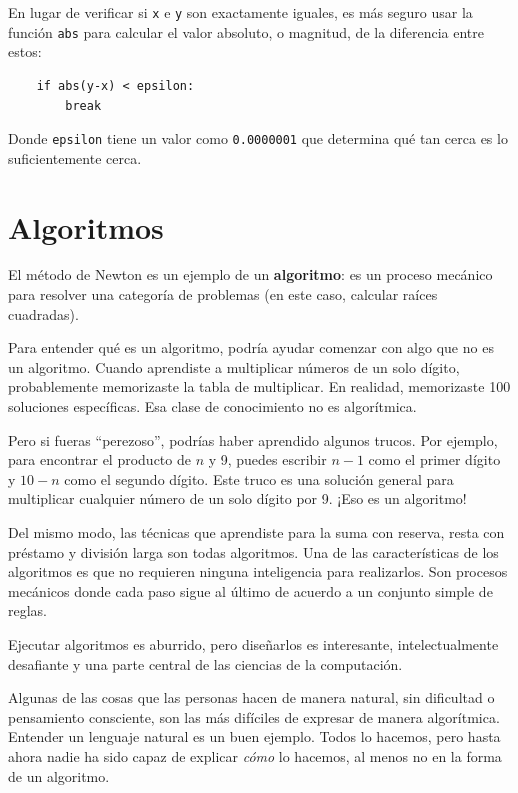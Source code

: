 \documentclass[10pt]{book}
\begin{document}
En lugar de verificar si {\tt x} e {\tt y} son exactamente iguales, es
más seguro usar la función {\tt abs} para calcular el
valor absoluto, o magnitud, de la diferencia entre estos:

\begin{verbatim}
    if abs(y-x) < epsilon:
        break
\end{verbatim}
%
Donde \verb"epsilon" tiene un valor como {\tt 0.0000001} que
determina qué tan cerca es lo suficientemente cerca.


\section{Algoritmos}

El método de Newton es un ejemplo de un {\bf algoritmo}: es un
proceso mecánico para resolver una categoría de problemas (en este
caso, calcular raíces cuadradas).

Para entender qué es un algoritmo, podría ayudar comenzar con
algo que no es un algoritmo.  Cuando aprendiste a multiplicar
números de un solo dígito, probablemente memorizaste la tabla de multiplicar.
En realidad, memorizaste 100 soluciones específicas.  Esa clase de
conocimiento no es algorítmica.

Pero si fueras ``perezoso'', podrías haber aprendido algunos
trucos.  Por ejemplo, para encontrar el producto de $n$ y 9, puedes
escribir $n-1$ como el primer dígito y $10-n$ como el segundo
dígito.  Este truco es una solución general para multiplicar cualquier
número de un solo dígito por 9.  ¡Eso es un algoritmo!

Del mismo modo, las técnicas que aprendiste para la suma con reserva,
resta con préstamo y división larga son todas algoritmos.  Una
de las características de los algoritmos es que no requieren ninguna
inteligencia para realizarlos.  Son procesos mecánicos donde
cada paso sigue al último de acuerdo a un conjunto simple de reglas.

Ejecutar algoritmos es aburrido, pero diseñarlos es interesante,
intelectualmente desafiante y una parte central de las ciencias de la computación.

Algunas de las cosas que las personas hacen de manera natural, sin dificultad o
pensamiento consciente, son las más difíciles de expresar de manera algorítmica.
Entender un lenguaje natural es un buen ejemplo.  Todos lo hacemos, pero
hasta ahora nadie ha sido capaz de explicar {\em cómo} lo hacemos, al menos
no en la forma de un algoritmo.
\end{document}
